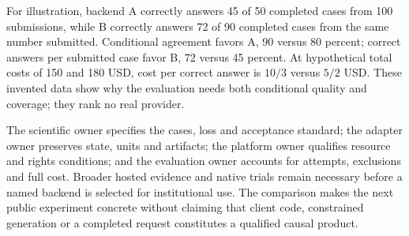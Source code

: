 For illustration, backend A correctly answers 45 of 50 completed cases from
100 submissions, while B correctly answers 72 of 90 completed cases from
the same number submitted. Conditional agreement favors A, 90 versus
80 percent; correct answers per submitted case favor B, 72 versus 45 percent.
At hypothetical total costs of 150 and 180 USD, cost per correct answer is
$10/3$ versus $5/2$ USD. These invented data show why the evaluation needs
both conditional quality and coverage; they rank no real provider.
\citep{exec24_backend_reference}

The scientific owner specifies the cases, loss and acceptance standard;
the adapter owner preserves state, units and artifacts; the platform owner
qualifies resource and rights conditions; and the evaluation owner accounts
for attempts, exclusions and full cost. Broader hosted evidence and native
trials remain necessary before a named backend is selected for institutional
use. The comparison makes the next public experiment concrete without
claiming that client code, constrained generation or a completed request
constitutes a qualified causal product.
\citep{exec24_backend_reference}
